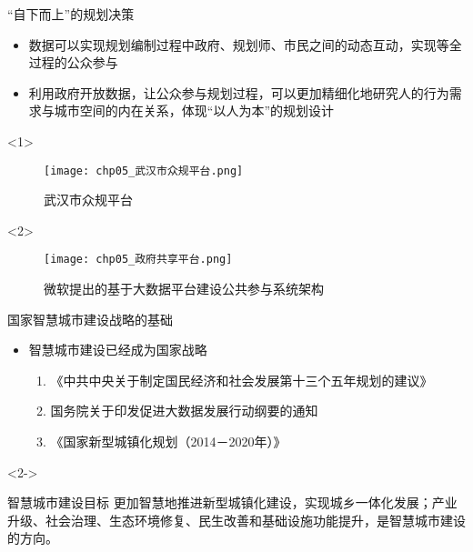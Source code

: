 \begin{frame}[t]{“自下而上”的规划决策}
\begin{itemize}
\item<1-> 数据可以实现规划编制过程中政府、规划师、市民之间的动态互动，实现等全过程的公众参与
\item<2-> 利用政府开放数据，让公众参与规划过程，可以更加精细化地研究人的行为需求与城市空间的内在关系，体现“以人为本”的规划设计
\end{itemize}

\begin{overlayarea}{\textwidth}{\textheight}
\vspace{-5pt}
  \begin{onlyenv}<1>
\begin{figure}
  \centering
  \texttt{[image: chp05\_武汉市众规平台.png]}
  \caption{武汉市众规平台}
\end{figure}
  \end{onlyenv}

\vspace{-15pt}
  \begin{onlyenv}<2>
\begin{figure}
  \centering
  \texttt{[image: chp05\_政府共享平台.png]}
  \caption{微软提出的基于大数据平台建设公共参与系统架构}
\end{figure}
  \end{onlyenv}
\end{overlayarea}
\end{frame}

\begin{frame}[t]{国家智慧城市建设战略的基础}
\begin{itemize}
\item<1-> 智慧城市建设已经成为国家战略
\begin{enumerate}
\item 《中共中央关于制定国民经济和社会发展第十三个五年规划的建议》
\item 国务院关于印发促进大数据发展行动纲要的通知
\item 《国家新型城镇化规划（2014－2020年）》
\end{enumerate}
\end{itemize}

\begin{overlayarea}{\textwidth}{\textheight}
\vspace{5pt}
  \begin{onlyenv}<2->
\begin{badbox}{智慧城市建设目标} 
更加智慧地推进新型城镇化建设，实现城乡一体化发展；产业升级、社会治理、生态环境修复、民生改善和基础设施功能提升，是智慧城市建设的方向。
\end{badbox}
  \end{onlyenv}
\end{overlayarea}
\end{frame}

